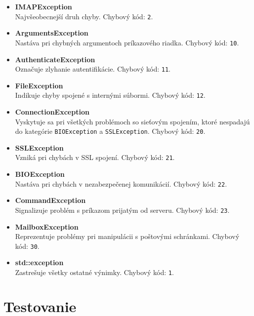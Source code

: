 \documentclass[a4paper, 11pt]{article}
\begin{document}
	\begin{itemize}
		\item \textbf{IMAPException} \\
		Najvšeobecnejší druh chyby. Chybový kód: \texttt{2}.
		\item \textbf{ArgumentsException} \\
		Nastáva pri chybných argumentoch príkazového riadka. Chybový kód: \texttt{10}.
		\item \textbf{AuthenticateException} \\
		Označuje zlyhanie autentifikácie. Chybový kód: \texttt{11}.
		\item \textbf{FileException} \\
		Indikuje chyby spojené s internými súbormi. Chybový kód: \texttt{12}.
		\item \textbf{ConnectionException} \\
		Vyskytuje sa pri všetkých problémoch so sieťovým spojením, ktoré nespadajú do kategórie \texttt{BIOException} a \texttt{SSLException}. Chybový kód: \texttt{20}.
		\item \textbf{SSLException} \\
		Vzniká pri chybách v SSL spojení. Chybový kód: \texttt{21}.
		\item \textbf{BIOException} \\
		Nastáva pri chybách v nezabezpečenej komunikácií. Chybový kód: \texttt{22}.
		\item \textbf{CommandException} \\
		Signalizuje problém s príkazom prijatým od serveru. Chybový kód: \texttt{23}.
		\item \textbf{MailboxException} \\
		Reprezentuje problémy pri manipulácii s poštovými schránkami. Chybový kód: \texttt{30}.
		\item \textbf{std::exception} \\
		Zastrešuje všetky ostatné výnimky. Chybový kód: \texttt{1}.
	\end{itemize}
	


	\section{Testovanie}
\end{document}
